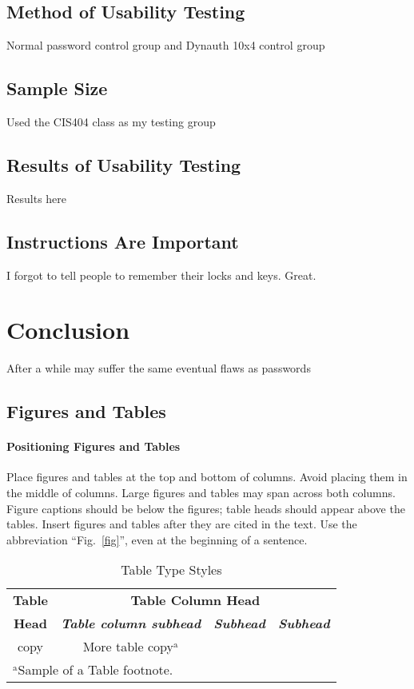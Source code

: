 \documentclass[conference]{IEEEtran}
\begin{document}
\subsection{Method of Usability Testing}
	Normal password control group and Dynauth 10x4 control group
\subsection{Sample Size}
	Used the CIS404 class as my testing group

\subsection{Results of Usability Testing}
	Results here
\subsection{Instructions Are Important}
	I forgot to tell people to remember their locks and keys. Great.

\section{Conclusion}
	After a while may suffer the same eventual flaws as passwords

\subsection{Figures and Tables}
\paragraph{Positioning Figures and Tables} Place figures and tables at the top and 
bottom of columns. Avoid placing them in the middle of columns. Large 
figures and tables may span across both columns. Figure captions should be 
below the figures; table heads should appear above the tables. Insert 
figures and tables after they are cited in the text. Use the abbreviation 
``Fig.~\ref{fig}'', even at the beginning of a sentence.

\begin{table}[htbp]
\caption{Table Type Styles}
\begin{center}
\begin{tabular}{|c|c|c|c|}
\hline
\textbf{Table}&\multicolumn{3}{|c|}{\textbf{Table Column Head}} \\
\cline{2-4} 
\textbf{Head} & \textbf{\textit{Table column subhead}}& \textbf{\textit{Subhead}}& \textbf{\textit{Subhead}} \\
\hline
copy& More table copy$^{\mathrm{a}}$& &  \\
\hline
\multicolumn{4}{l}{$^{\mathrm{a}}$Sample of a Table footnote.}
\end{tabular}
\label{tab1}
\end{center}
\end{table}
\end{document}

